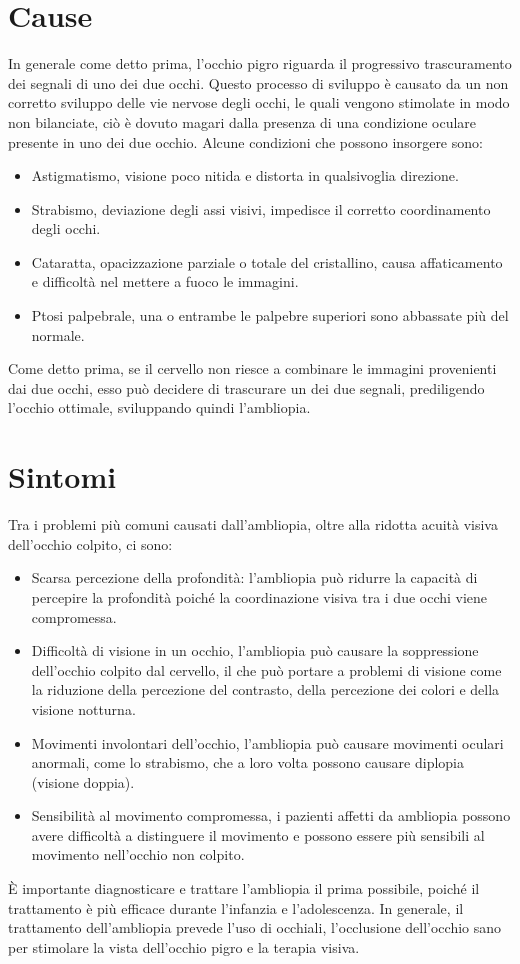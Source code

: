 \documentclass[
a4paper,
cleardoublepage=empty,
headings=twolinechapter,
numbers=autoenddot,
]{scrbook}
\begin{document}
	\section{Cause}
	In generale come detto prima, l'occhio pigro riguarda il progressivo trascuramento dei segnali di uno dei due occhi.
	Questo processo di sviluppo è causato da un non corretto sviluppo delle vie nervose degli occhi, le quali vengono stimolate in modo non bilanciate, ciò è dovuto magari dalla presenza di una condizione oculare presente in uno dei due occhio.
	Alcune condizioni che possono insorgere sono:
	\begin{itemize}
		\item Astigmatismo, visione poco nitida e distorta in qualsivoglia direzione.
		\item Strabismo, deviazione degli assi visivi, impedisce il corretto coordinamento degli occhi. 
		\item Cataratta, opacizzazione parziale o totale del cristallino,  causa affaticamento e difficoltà nel mettere a fuoco le immagini.
		\item Ptosi palpebrale, una o entrambe le palpebre superiori sono abbassate più del normale.
	\end{itemize}
	Come detto prima, se il cervello non riesce a combinare le immagini provenienti dai due occhi, esso può decidere di trascurare un dei due segnali, prediligendo l'occhio ottimale, sviluppando quindi l'ambliopia.
	\section{Sintomi}
	Tra i problemi più comuni causati dall'ambliopia, oltre alla ridotta acuità visiva dell'occhio colpito, ci sono:
	
	\begin{itemize}
		\item Scarsa percezione della profondità: l'ambliopia può ridurre la capacità di percepire la profondità poiché la coordinazione visiva tra i due occhi viene compromessa.
		\item Difficoltà di visione in un occhio, l'ambliopia può causare la soppressione dell'occhio colpito dal cervello, il che può portare a problemi di visione come la riduzione della percezione del contrasto, della percezione dei colori e della visione notturna.
		\item Movimenti involontari dell'occhio, l'ambliopia può causare movimenti oculari anormali, come lo strabismo, che a loro volta possono causare diplopia (visione doppia).
		\item Sensibilità al movimento compromessa, i pazienti affetti da ambliopia possono avere difficoltà a distinguere il movimento e possono essere più sensibili al movimento nell'occhio non colpito.
	\end{itemize}
	È importante diagnosticare e trattare l'ambliopia il prima possibile, poiché il trattamento è più efficace durante l'infanzia e l'adolescenza. In generale, il trattamento dell'ambliopia prevede l'uso di occhiali, l'occlusione dell'occhio sano per stimolare la vista dell'occhio pigro e la terapia visiva.
\end{document}
